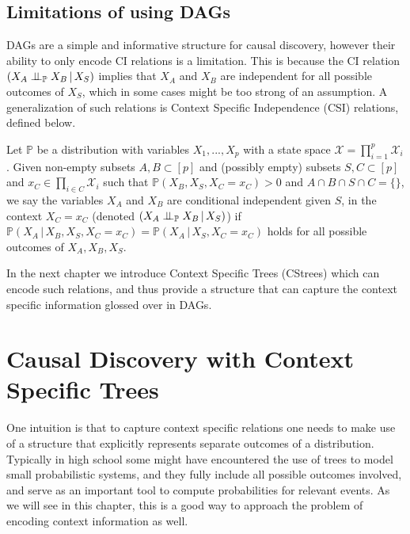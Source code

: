 \documentclass{tufte-book}
\begin{document}
\begin{Definition}
\section{Limitations of using DAGs}
\label{sec:org70d2e51}
DAGs are a simple and informative structure for causal discovery, however their ability to only encode CI relations is a limitation. This is because the CI relation  \((X_A \perp \!\!\! \perp_{\mathbb{P}} X_B \,|\, X_S)\) implies that \(X_A\) and \(X_B\) are independent for all possible outcomes of \(X_S\), which in some cases might be too strong of an assumption. A generalization of such relations is Context Specific Independence (CSI) relations, defined below.
\begin{definition}\label{def:csirel}
Let  $\mathbb{P}$ be a distribution with variables $X_1,...,X_p$ with a state space $\mathcal{X} = \prod_{i=1}^p \mathcal{X}_i$. Given non-empty subsets $A,B \subset [p]$ and (possibly empty) subsets $S,C \subset [p]$ and $x_C \in \prod_{i \in C}\mathcal{X}_i $ such that $\mathbb{P}(X_B, X_S, X_C = x_C)>0$ and $A \cap B \cap S \cap C = \{\}$, we say the variables $X_A$ and $X_B$ are conditional independent given $S$, in the context $X_C=x_C$ (denoted $(X_A\perp \!\!\! \perp_{\mathbb{P}} X_B \,|\, X_S)$) if $\mathbb{P}(X_A \,|\,X_B, X_S,X_C=x_C) = \mathbb{P}(X_A \, |\, X_S,X_C=x_C)$ holds for all possible outcomes of $X_A,X_B,X_S$.
\end{definition}


In the next chapter we introduce Context Specific Trees (CStrees) which can encode such relations, and thus provide a structure that can capture the context specific information glossed over in DAGs.


 \newpage 

\chapter{Causal Discovery with Context Specific Trees}
\label{sec:org8d84397}
One intuition is that to capture context specific relations one needs to make use of a structure that explicitly represents separate outcomes of a distribution. Typically in high school some might have encountered the use of trees to model small probabilistic systems, and they fully include all possible outcomes involved, and serve as an important tool to compute probabilities for relevant events. As we will see in this chapter, this is a good way to approach the problem of encoding context information as well.


\end{Definition}
\end{document}
